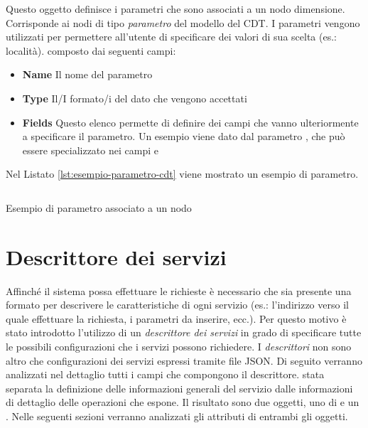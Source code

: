 Questo oggetto definisce i parametri che sono associati a un nodo dimensione. Corrisponde ai nodi di tipo \emph{parametro} del modello del CDT. I parametri vengono utilizzati per permettere all'utente di specificare dei valori di sua scelta (es.: località). \upe composto dai seguenti campi:

\begin{itemize}
	\item \textbf{Name}
	Il nome del parametro
	\item \textbf{Type}
	Il/I formato/i del dato che vengono accettati
	\item \textbf{Fields}
	Questo elenco permette di definire dei campi che vanno ulteriormente a specificare il parametro. Un esempio viene dato dal parametro , che può essere specializzato nei campi  e 
\end{itemize}

Nel Listato \ref{lst:esempio-parametro-cdt} viene mostrato un esempio di parametro.

\begin{listing}[H]
	\inputminted{json}{5-implementazione-backend/Codice/esempio_parametro_cdt.json}
	\caption{Esempio di parametro associato a un nodo}
	\label{lst:esempio-parametro-cdt}
\end{listing}

\section{Descrittore dei servizi\label{sec:descrittore-servizi}}

Affinché il sistema possa effettuare le richieste è necessario che sia presente una formato per descrivere le caratteristiche di ogni servizio (es.: l'indirizzo verso il quale effettuare la richiesta, i parametri da inserire, ecc.). Per questo motivo è stato introdotto l'utilizzo di un \emph{descrittore dei servizi} in grado di specificare tutte le possibili configurazioni che i servizi possono richiedere. I \emph{descrittori} non sono altro che configurazioni dei servizi espressi tramite file JSON. Di seguito verranno analizzati nel dettaglio tutti i campi che compongono il descrittore. \upe stata separata la definizione delle informazioni generali del servizio dalle informazioni di dettaglio delle operazioni che espone. Il risultato sono due oggetti, uno di  e un . Nelle seguenti sezioni verranno analizzati gli attributi di entrambi gli oggetti.

